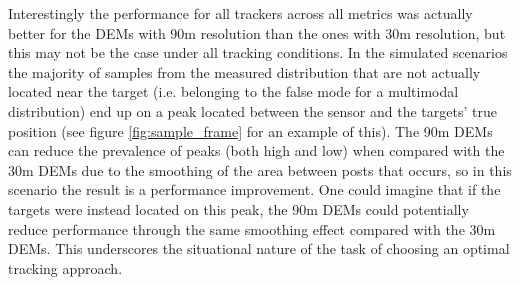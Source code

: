 \documentclass[journal]{IEEEtran}
\begin{document}
Interestingly the performance for all trackers across all metrics was actually better for the DEMs with 90m resolution than the ones with 30m resolution, but this may not be the case under all tracking conditions. In the simulated scenarios the majority of samples from the measured distribution that are not actually located near the target (i.e. belonging to the false mode for a multimodal distribution) end up on a peak located between the sensor and the targets' true position (see figure \ref{fig:sample_frame} for an example of this). The 90m DEMs can reduce the prevalence of peaks (both high and low) when compared with the 30m DEMs due to the smoothing of the area between posts that occurs, so in this scenario the result is a performance improvement. One could imagine that if the targets were instead located on this peak, the 90m DEMs could potentially reduce performance through the same smoothing effect compared with the 30m DEMs. This underscores the situational nature of the task of choosing an optimal tracking approach.
\end{document}
